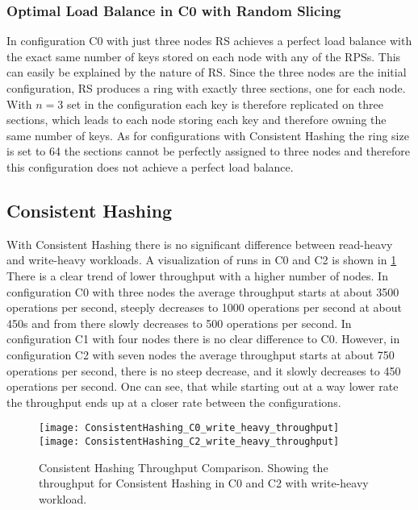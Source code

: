 \subsubsection{Optimal Load Balance in C0 with Random Slicing}
In configuration C0 with just three nodes \ac{RS} achieves a perfect load balance with the exact same number of keys stored on each node with any of the \acp{RPS}.
This can easily be explained by the nature of \ac{RS}.
Since the three nodes are the initial configuration, \ac{RS} produces a ring with exactly three sections, one for each node.
With $n=3$ set in the configuration each key is therefore replicated on three sections, which leads to each node storing each key and therefore owning the same number of keys.
As for configurations with Consistent Hashing the ring size is set to 64 the sections cannot be perfectly assigned to three nodes and therefore this configuration does not achieve a perfect load balance.

\subsection{Consistent Hashing}
With Consistent Hashing there is no significant difference between read-heavy and write-heavy workloads.
A visualization of runs in C0 and C2 is shown in \cref{fig:throughput_consistent_hashing}
There is a clear trend of lower throughput with a higher number of nodes.
In configuration C0 with three nodes the average throughput starts at about 3500 operations per second, steeply decreases to 1000 operations per second at about 450s and from there slowly decreases to 500 operations per second.
In configuration C1 with four nodes there is no clear difference to C0.
However, in configuration C2 with seven nodes the average throughput starts at about 750 operations per second, there is no steep decrease, and it slowly decreases to 450 operations per second.
One can see, that while starting out at a way lower rate the throughput ends up at a closer rate between the configurations.
\begin{figure}
\texttt{[image: ConsistentHashing\_C0\_write\_heavy\_throughput]}
\texttt{[image: ConsistentHashing\_C2\_write\_heavy\_throughput]}
\caption[Consistent Hashing Throughput Comparison]{Consistent Hashing Throughput Comparison. Showing the throughput for Consistent Hashing in C0 and C2 with write-heavy workload.}
\label{fig:throughput_consistent_hashing}
\end{figure}

